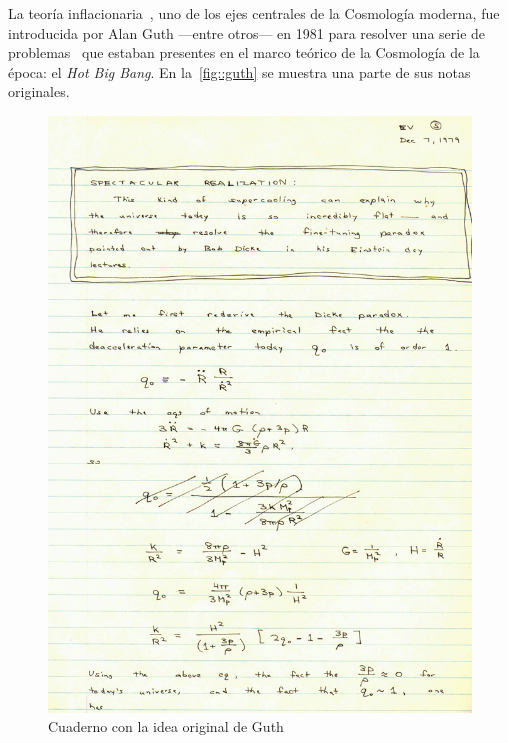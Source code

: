 La teoría inflacionaria~\cite{albrecht1982cosmology,guth1981inflationary,linde1982new}, uno de los ejes centrales de la Cosmología moderna, fue introducida por Alan Guth ---entre otros--- en 1981 para resolver una serie de problemas~\cite{peebles1993principles} que estaban presentes en el marco teórico de la Cosmología de la época: el \textit{Hot Big Bang}. En la~\autoref{fig::guth} se muestra una parte de sus notas originales.
\begin{figure}[t]
    \centering
    \includegraphics[scale=1.06]{img/AlanGuth.jpg}
    \caption{Cuaderno con la idea original de Guth}
    \label{fig::guth}
\end{figure}

